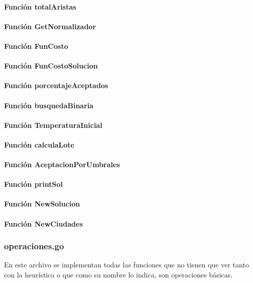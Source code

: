 \documentclass[
10pt,
a4paper,
oneside,
headinclude,footinclude,
BCOR5mm,
]{article}
\begin{document}
\paragraph{Función totalAristas}
\paragraph{Función GetNormalizador}
\paragraph{Función FunCosto}
\paragraph{Función FunCostoSolucion}
\paragraph{Función porcentajeAceptados}
\paragraph{Función busquedaBinaria}
\paragraph{Función TemperaturaInicial}
\paragraph{Función calculaLote}
\paragraph{Función AceptacionPorUmbrales}
\paragraph{Función printSol}
\paragraph{Función NewSolucion}
\paragraph{Función NewCiudades}


\subsubsection{operaciones.go}
En este archivo se implementan todas las funciones que no tienen que ver tanto
con la heurística o que como su nombre lo indica, son operaciones básicas.
\end{document}
